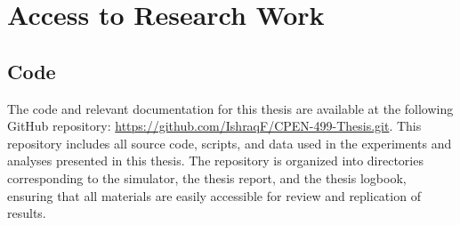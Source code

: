 \chapter{Access to Research Work}

\section{Code}

The code and relevant documentation for this thesis are available at the following GitHub repository: \url{https://github.com/IshraqF/CPEN-499-Thesis.git}. This repository includes all source code, scripts, and data used in the experiments and analyses presented in this thesis. The repository is organized into directories corresponding to the simulator, the thesis report, and the thesis logbook, ensuring that all materials are easily accessible for review and replication of results.